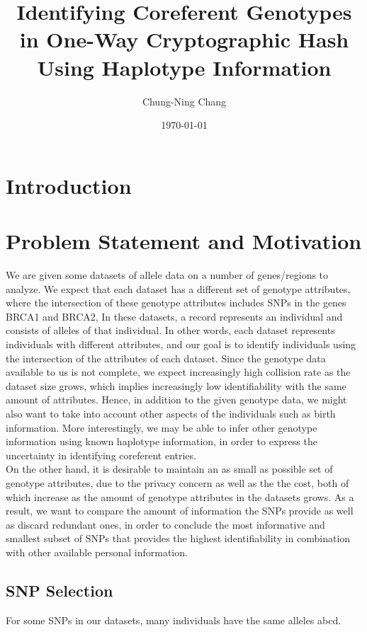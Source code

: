 \documentclass[14pt, oneside]{article}   	%
\title{Identifying Coreferent Genotypes in One-Way Cryptographic Hash Using Haplotype Information}
\author{Chung-Ning Chang}
\date{\today}							%
\begin{document}
\maketitle

\section{Introduction}

\section{Problem Statement and Motivation}
We are given some datasets of allele data on a number of genes/regions to analyze.
We expect that each dataset has a different set of genotype attributes,
where the intersection of these genotype attributes includes SNPs in the genes BRCA1 and BRCA2,
In these datasets, a record represents an individual and consists of alleles of that individual.
In other words, each dataset represents individuals with different attributes,
and our goal is to identify individuals using the intersection of the attributes of each dataset. 
Since the genotype data available to us is not complete, we expect increasingly high collision rate as the dataset size grows,
which implies increasingly low identifiability with the same amount of attributes.
Hence, in addition to the given genotype data, we might also want to take into account other aspects of the individuals such as birth information.
More interestingly, we may be able to infer other genotype information using known haplotype information,
in order to express the uncertainty in identifying coreferent entries.
\\
%
On the other hand, it is desirable to maintain an as small as possible set of genotype attributes,
due to the privacy concern as well as the the cost,
both of which increase as the amount of genotype attributes in the datasets grows.
As a result, we want to compare the amount of information the SNPs provide as well as discard redundant ones,
in order to conclude the most informative and smallest subset of SNPs that provides the highest identifiability in combination with other available personal information.
\\
%
\subsection{SNP Selection}
For some SNPs in our datasets, many individuals have the same alleles
abcd.
\\
%
\end{document}
